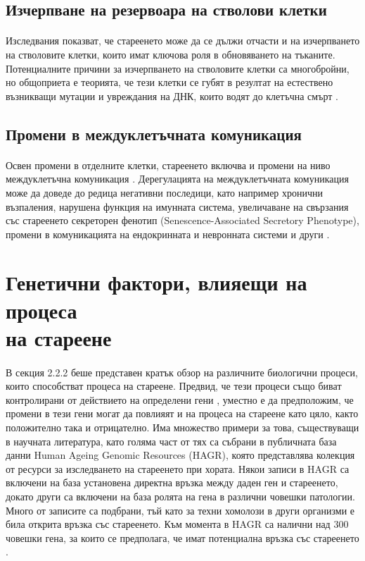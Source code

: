 \documentclass[pdftex,cyrillic,14pt,a4page,twoside,openright]{extreport}
\begin{document}
\subsection{Изчерпване на резервоара на стволови клетки}
\paragraph{}
Изследвания показват, че стареенето може да се дължи отчасти и на изчерпването на стволовите клетки, които имат ключова роля в обновяването на тъканите. Потенциалните причини за изчерпването на стволовите клетки са многобройни, но общоприета е теорията, че тези клетки се губят в резултат на естествено възникващи мутации и увреждания на ДНК, които водят до клетъчна смърт \cite{ruzankina2007, revuelta2017}.

\subsection{Промени в междуклетъчната комуникация}
\paragraph{}
Освен промени в отделните клетки, стареенето включва и промени на ниво междуклетъчна комуникация \cite{lopezotin2013}. Дерегулацията на междуклетъчната комуникация може да доведе до редица негативни последици, като например хронични възпаления, нарушена функция на имунната система, увеличаване на свързания със стареенето секреторен фенотип (Senescence-Associated Secretory Phenotype), промени в комуникацията на ендокринната и невронната системи и други \cite{lagger2021}.

\section[Генетични фактори, влияещи на процеса на стареене]{Генетични фактори, влияещи на процеса\\ на стареене}
\paragraph{}
В секция 2.2.2 беше представен кратък обзор на различните биологични процеси, които способстват процеса на стареене. Предвид, че тези процеси също биват контролирани от действието на определени гени \cite{liu2004, jin2018, tominaga2002}, уместно е да предположим, че промени в тези гени могат да повлияят и на процеса на стареене като цяло, както положително така и отрицателно. Има множество примери за това, съществуващи в научната литература, като голяма част от тях са събрани в публичната база данни Human Ageing Genomic Resources (HAGR), която представлява колекция от ресурси за изследването на стареенето при хората. Някои записи в HAGR са включени на база установена директна връзка между даден ген и стареенето, докато други са включени на база ролята на гена в различни човешки патологии. Много от записите са подбрани, тъй като за техни хомолози в други организми е била открита връзка със стареенето. Към момента в HAGR са налични над 300 човешки гена, за които се предполага, че имат потенциална връзка със стареенето \cite{tacutu2018}.
\end{document}
